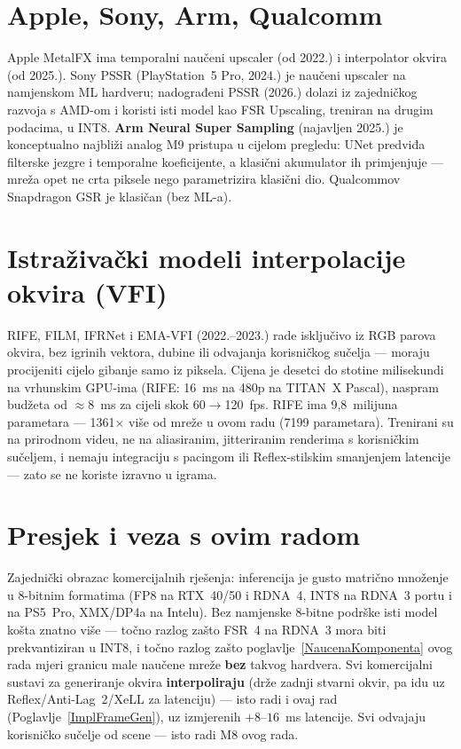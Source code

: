\documentclass{mathos}
\begin{document}
\section{Apple, Sony, Arm, Qualcomm}

Apple MetalFX ima temporalni naučeni upscaler (od 2022.) i interpolator
okvira (od 2025.). Sony PSSR (PlayStation~5 Pro, 2024.) je naučeni upscaler
na namjenskom ML hardveru; nadograđeni PSSR (2026.) dolazi iz zajedničkog
razvoja s AMD-om i koristi isti model kao FSR Upscaling, treniran na drugim
podacima, u INT8. \textbf{Arm Neural Super Sampling} \cite{ArmNSS} (najavljen 2025.) je
konceptualno najbliži analog M9 pristupa u cijelom pregledu: UNet predviđa
filterske jezgre i temporalne koeficijente, a klasični akumulator ih
primjenjuje — mreža opet ne crta piksele nego parametrizira klasični dio.
Qualcommov Snapdragon GSR je klasičan (bez ML-a).

\section{Istraživački modeli interpolacije okvira (VFI)}

RIFE, FILM, IFRNet i EMA-VFI (2022.--2023.) rade isključivo iz RGB parova
okvira, bez igrinih vektora, dubine ili odvajanja korisničkog sučelja —
moraju procijeniti cijelo gibanje samo iz piksela. Cijena je desetci do
stotine milisekundi na vrhunskim GPU-ima (RIFE: 16~ms na 480p na TITAN~X
Pascal), naspram budžeta od $\approx$8~ms za cijeli skok 60$\to$120~fps.
RIFE ima 9,8~milijuna parametara — 1361$\times$ više od mreže u ovom radu
(7199 parametara). Trenirani su na prirodnom videu, ne na aliasiranim,
jitteriranim renderima s korisničkim sučeljem, i nemaju integraciju s
pacingom ili Reflex-stilskim smanjenjem latencije — zato se ne koriste
izravno u igrama.

\section{Presjek i veza s ovim radom}

Zajednički obrazac komercijalnih rješenja: inferencija je gusto matrično
množenje u 8-bitnim formatima (FP8 na RTX~40/50 i RDNA~4, INT8 na RDNA~3
portu i na PS5~Pro, XMX/DP4a na Intelu). Bez namjenske 8-bitne podrške isti
model košta znatno više — točno razlog zašto FSR~4 na RDNA~3 mora biti
prekvantiziran u INT8, i točno razlog zašto poglavlje~\ref{NaucenaKomponenta}
ovog rada mjeri granicu male naučene mreže \textbf{bez} takvog hardvera. Svi
komercijalni sustavi za generiranje okvira \textbf{interpoliraju} (drže
zadnji stvarni okvir, pa idu uz Reflex/Anti-Lag~2/XeLL za latenciju) — isto
radi i ovaj rad (Poglavlje~\ref{ImplFrameGen}), uz izmjerenih $+8$--$16$~ms
latencije. Svi odvajaju korisničko sučelje od scene — isto radi M8 ovog
rada.
\end{document}

